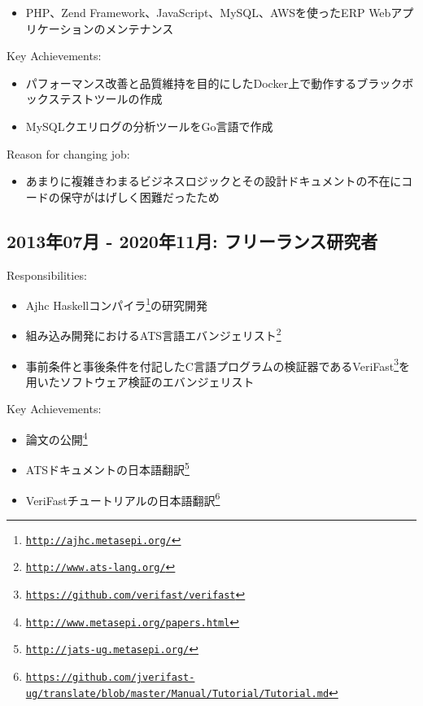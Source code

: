 \documentclass[letterpaper]{article}
\begin{document}
\begin{itemize}
  \item PHP、Zend Framework、JavaScript、MySQL、AWSを使ったERP Webアプリケーションのメンテナンス
\end{itemize}

\noindent Key Achievements:

\begin{itemize}
  \item パフォーマンス改善と品質維持を目的にしたDocker上で動作するブラックボックステストツールの作成
  \item MySQLクエリログの分析ツールをGo言語で作成
\end{itemize}

\noindent Reason for changing job:

\begin{itemize}
  \item あまりに複雑きわまるビジネスロジックとその設計ドキュメントの不在にコードの保守がはげしく困難だったため
\end{itemize}

\subsection*{2013年07月 - 2020年11月: フリーランス研究者}

\noindent Responsibilities:

\begin{itemize}
  \item Ajhc Haskellコンパイラ\footnote{\href{http://ajhc.metasepi.org/}{\tt http://ajhc.metasepi.org/}}の研究開発
  \item 組み込み開発におけるATS言語エバンジェリスト\footnote{\href{http://www.ats-lang.org/}{\tt http://www.ats-lang.org/}}
  \item 事前条件と事後条件を付記したC言語プログラムの検証器であるVeriFast\footnote{\href{https://github.com/verifast/verifast}{\tt https://github.com/verifast/verifast}}を用いたソフトウェア検証のエバンジェリスト
\end{itemize}

\noindent Key Achievements:

\begin{itemize}
  \item 論文の公開\footnote{\href{http://www.metasepi.org/papers.html}{\tt http://www.metasepi.org/papers.html}}
  \item ATSドキュメントの日本語翻訳\footnote{\href{http://jats-ug.metasepi.org/}{\tt http://jats-ug.metasepi.org/}}
  \item VeriFastチュートリアルの日本語翻訳\footnote{\href{https://github.com/jverifast-ug/translate/blob/master/Manual/Tutorial/Tutorial.md}{\tt https://github.com/jverifast-ug/translate/blob/master/Manual/Tutorial/Tutorial.md}}
\end{itemize}
\end{document}
